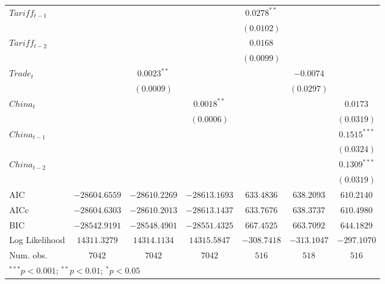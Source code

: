 \documentclass[
]{article}
\begin{document}
{\begin{appendix}
\begin{table}
\begin{center}
\begin{tabular}{l c c c c c c}
$Tariff_{t-1}$ &                 &                 &                 & $0.0278^{**}$   &                 &                 \\
               &                 &                 &                 & $(0.0102)$      &                 &                 \\
$Tariff_{t-2}$ &                 &                 &                 & $0.0168$        &                 &                 \\
               &                 &                 &                 & $(0.0099)$      &                 &                 \\
$Trade_{t}$    &                 & $0.0023^{**}$   &                 &                 & $-0.0074$       &                 \\
               &                 & $(0.0009)$      &                 &                 & $(0.0297)$      &                 \\
$China_{t}$    &                 &                 & $0.0018^{**}$   &                 &                 & $0.0173$        \\
               &                 &                 & $(0.0006)$      &                 &                 & $(0.0319)$      \\
$China_{t-1}$  &                 &                 &                 &                 &                 & $0.1515^{***}$  \\
               &                 &                 &                 &                 &                 & $(0.0324)$      \\
$China_{t-2}$  &                 &                 &                 &                 &                 & $0.1309^{***}$  \\
               &                 &                 &                 &                 &                 & $(0.0319)$      \\
\hline
AIC            & $-28604.6559$   & $-28610.2269$   & $-28613.1693$   & $633.4836$      & $638.2093$      & $610.2140$      \\
AICc           & $-28604.6303$   & $-28610.2013$   & $-28613.1437$   & $633.7676$      & $638.3737$      & $610.4980$      \\
BIC            & $-28542.9191$   & $-28548.4901$   & $-28551.4325$   & $667.4525$      & $663.7092$      & $644.1829$      \\
Log Likelihood & $14311.3279$    & $14314.1134$    & $14315.5847$    & $-308.7418$     & $-313.1047$     & $-297.1070$     \\
Num. obs.      & $7042$          & $7042$          & $7042$          & $516$           & $518$           & $516$           \\
\hline
\multicolumn{7}{l}{\scriptsize{$^{***}p<0.001$; $^{**}p<0.01$; $^{*}p<0.05$}}
\end{tabular}
\label{tab:armax_term}
\end{center}
\end{table}


\end{appendix}}
\end{document}
